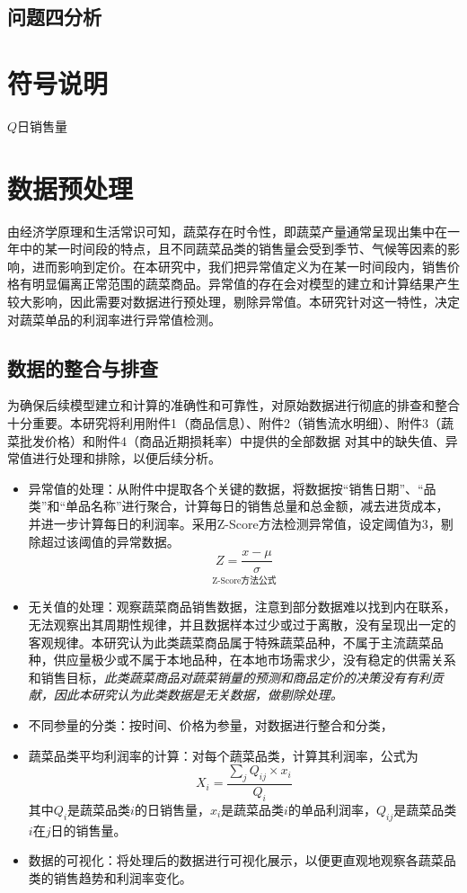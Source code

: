 \documentclass{article}
\begin{document}
\subsection{问题四分析}

\section{符号说明}

$ Q $日销售量
\section{数据预处理}

由经济学原理和生活常识可知，蔬菜存在时令性，即蔬菜产量通常呈现出集中在一年中的某一时间段的特点，且不同蔬菜品类的销售量会受到季节、气候等因素的影响，进而影响到定价。在本研究中，我们把异常值定义为在某一时间段内，销售价格有明显偏离正常范围的蔬菜商品。异常值的存在会对模型的建立和计算结果产生较大影响，因此需要对数据进行预处理，剔除异常值。本研究针对这一特性，决定对蔬菜单品的利润率进行异常值检测。
\subsection{数据的整合与排查}
为确保后续模型建立和计算的准确性和可靠性，对原始数据进行彻底的排查和整合十分重要。本研究将利用附件1（商品信息）、附件2（销售流水明细）、附件3（蔬菜批发价格）和附件4（商品近期损耗率）中提供的全部数据
对其中的缺失值、异常值进行处理和排除，以便后续分析。
\begin{itemize}
    \item 异常值的处理：从附件中提取各个关键的数据，将数据按“销售日期”、“品类”和“单品名称”进行聚合，计算每日的销售总量和总金额，减去进货成本，并进一步计算每日的利润率。采用Z-Score方法检测异常值，设定阈值为3，剔除超过该阈值的异常数据。
    \[
\underset{\text{Z-Score方法公式}}{Z = \frac{x - \mu}{\sigma}}
\]

    \item 无关值的处理：观察蔬菜商品销售数据，注意到部分数据难以找到内在联系，无法观察出其周期性规律，并且数据样本过少或过于离散，没有呈现出一定的客观规律。本研究认为此类蔬菜商品属于特殊蔬菜品种，不属于主流蔬菜品种，供应量极少或不属于本地品种，在本地市场需求少，没有稳定的供需关系和销售目标，\textit{此类蔬菜商品对蔬菜销量的预测和商品定价的决策没有有利贡献，因此本研究认为此类数据是无关数据，做剔除处理。}
    
    \item 不同参量的分类：按时间、价格为参量，对数据进行整合和分类，
    
    \item 蔬菜品类平均利润率的计算：对每个蔬菜品类，计算其利润率，公式为
    \[
X_i = \frac{\sum_j Q_{ij} \times x_i}{Q_i}
\]
其中$ Q_i$是蔬菜品类$i$的日销售量，$x_i$是蔬菜品类$i$的单品利润率，$Q_{ij}$是蔬菜品类$i$在$j$日的销售量。
    
    \item 数据的可视化：将处理后的数据进行可视化展示，以便更直观地观察各蔬菜品类的销售趋势和利润率变化。
\end{itemize}
\end{document}
